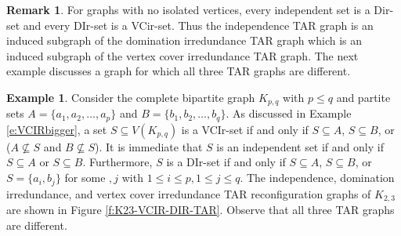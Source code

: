 \documentclass{article}
\numberwithin{figure}{section}
\numberwithin{table}{section}
\numberwithin{equation}{section}
\theoremstyle{definition}
\newtheorem{rem}[thm]{Remark}
\theoremstyle{definition}
\theoremstyle{definition}
\newtheorem{ex}[thm]{Example}
\begin{document}
 \begin{rem}
    For graphs with no isolated vertices, every independent set is a Dir-set and every DIr-set is a VCir-set.  Thus the independence TAR graph is an induced subgraph of the domination irredundance TAR graph which is an induced subgraph of the vertex cover irredundance TAR graph. The next example discusses a graph for which all three TAR graphs are different.
    \end{rem}

    \begin{ex}
     Consider the complete bipartite graph $K_{p,q}$ with $p \leq q$ and partite sets $A=\{a_1,a_2,\dots,a_p\}$ and $B=\{b_1,b_2,\dots,b_q\}$. As discussed in Example \ref{e:VCIRbigger}, a set $S\subseteq V(K_{p,q})$ is a VCIr-set if and only if 
     $S\subseteq A$, $S\subseteq B$, or ($A\not\subseteq S$ and $B\not\subseteq S$). It is immediate that $S$ is an independent set if and only if $S\subseteq A$ or $S\subseteq B$.  Furthermore, $S$ is a DIr-set if and only if $S\subseteq A$, $S\subseteq B$, or $S=\{a_i,b_j\}$ for some $,j$ with $1\le i
     \le p, 1\le j\le q$.
     The independence, domination irredundance, and vertex cover irredundance TAR reconfiguration graphs of $K_{2,3}$ are shown in  Figure \ref{f:K23-VCIR-DIR-TAR}.  Observe that all three TAR graphs are different.
    \end{ex}
    
\end{document}
